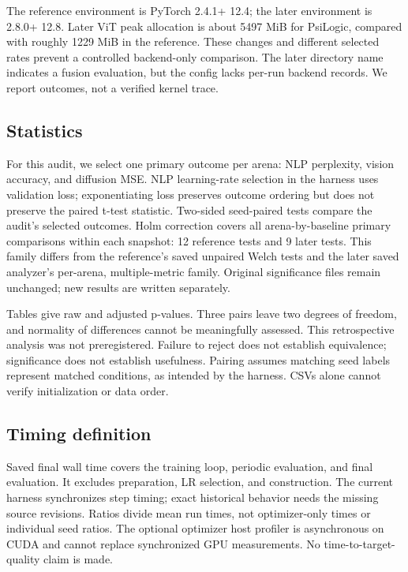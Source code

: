 \documentclass[11pt,a4paper]{article}
\theoremstyle{definition}
\theoremstyle{remark}
\begin{document}
The reference environment is PyTorch 2.4.1+ 12.4; the later environment is 2.8.0+ 12.8. Later ViT peak allocation is about 5497 MiB for PsiLogic, compared with roughly 1229 MiB in the reference. These changes and different selected rates prevent a controlled backend-only comparison. The later directory name indicates a fusion evaluation, but the config lacks per-run backend records. We report outcomes, not a verified kernel trace.

\subsection{Statistics}

For this audit, we select one primary outcome per arena: NLP perplexity, vision accuracy, and diffusion MSE. NLP learning-rate selection in the harness uses validation loss; exponentiating loss preserves outcome ordering but does not preserve the paired t-test statistic. Two-sided seed-paired tests compare the audit's selected outcomes. Holm correction covers all arena-by-baseline primary comparisons within each snapshot: 12 reference tests and 9 later tests. This family differs from the reference's saved unpaired Welch tests and the later saved analyzer's per-arena, multiple-metric family. Original significance files remain unchanged; new results are written separately.

Tables give raw and adjusted p-values. Three pairs leave two degrees of freedom, and normality of differences cannot be meaningfully assessed. This retrospective analysis was not preregistered. Failure to reject does not establish equivalence; significance does not establish usefulness. Pairing assumes matching seed labels represent matched conditions, as intended by the harness. CSVs alone cannot verify initialization or data order.

\subsection{Timing definition}

Saved final wall time covers the training loop, periodic evaluation, and final evaluation. It excludes preparation, LR selection, and  construction. The current harness synchronizes step timing; exact historical behavior needs the missing source revisions. Ratios divide mean run times, not optimizer-only times or individual seed ratios. The optional optimizer host profiler is asynchronous on CUDA and cannot replace synchronized GPU measurements. No time-to-target-quality claim is made.
\end{document}
